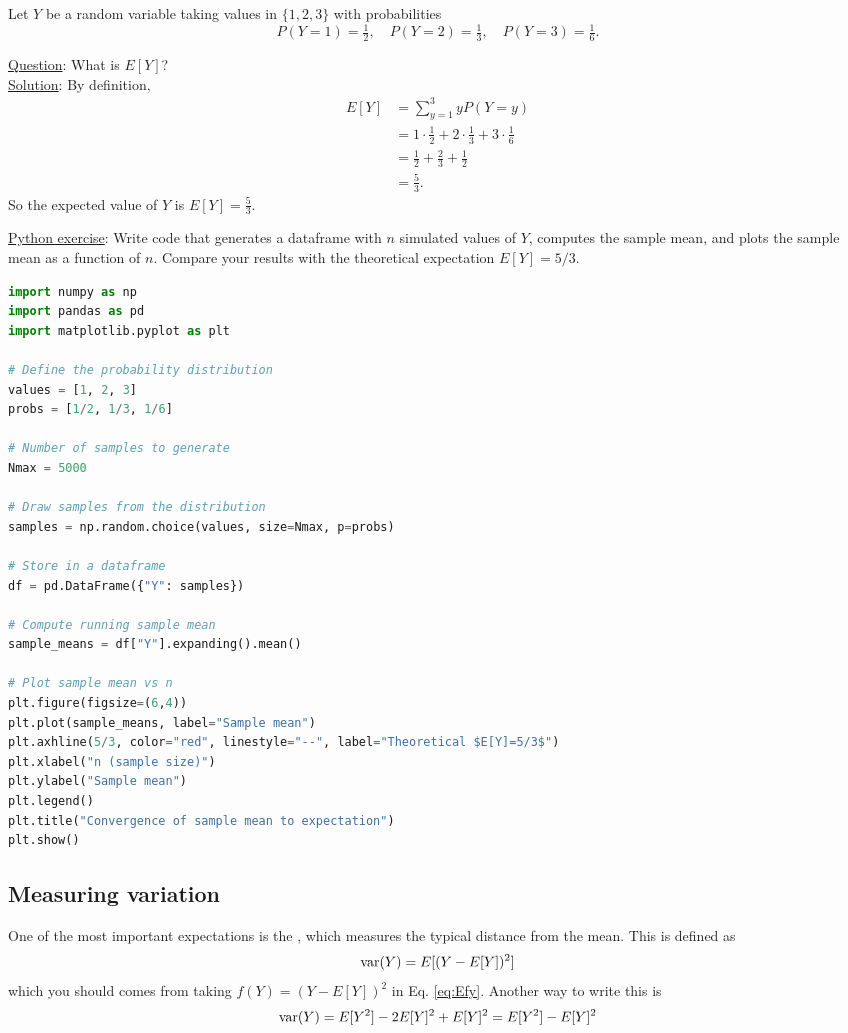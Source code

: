 \begin{example}
Let $Y$ be a random variable taking values in $\{1,2,3\}$ with probabilities
\[
P(Y=1)=\tfrac{1}{2}, \quad P(Y=2)=\tfrac{1}{3}, \quad P(Y=3)=\tfrac{1}{6}.
\]

\noindent
\underline{Question}: What is $E[Y]$?\\

\noindent
\underline{Solution}: By definition,
\begin{align*}
E[Y] &= \sum_{y=1}^3 y P(Y=y) \\
     &= 1\cdot \tfrac{1}{2} + 2\cdot \tfrac{1}{3} + 3\cdot \tfrac{1}{6} \\
     &= \tfrac{1}{2} + \tfrac{2}{3} + \tfrac{1}{2} \\
     &= \tfrac{5}{3}.
\end{align*}
So the expected value of $Y$ is $E[Y] = \tfrac{5}{3}$. 

\noindent
\underline{Python exercise}: Write code that generates a dataframe with $n$ simulated values of $Y$, computes the sample mean, and plots the sample mean as a function of $n$. Compare your results with the theoretical expectation $E[Y]=5/3$. 

\begin{lstlisting}[language=Python]
import numpy as np
import pandas as pd
import matplotlib.pyplot as plt

# Define the probability distribution
values = [1, 2, 3]
probs = [1/2, 1/3, 1/6]

# Number of samples to generate
Nmax = 5000

# Draw samples from the distribution
samples = np.random.choice(values, size=Nmax, p=probs)

# Store in a dataframe
df = pd.DataFrame({"Y": samples})

# Compute running sample mean
sample_means = df["Y"].expanding().mean()

# Plot sample mean vs n
plt.figure(figsize=(6,4))
plt.plot(sample_means, label="Sample mean")
plt.axhline(5/3, color="red", linestyle="--", label="Theoretical $E[Y]=5/3$")
plt.xlabel("n (sample size)")
plt.ylabel("Sample mean")
plt.legend()
plt.title("Convergence of sample mean to expectation")
plt.show()
\end{lstlisting}
\end{example}

\subsection{Measuring variation}
One of the most important expectations is the , which measures the typical distance from the mean. This is defined as
\begin{equation*}
{\rm var}(Y) = E[(Y-E[Y])^2]
\end{equation*}
which you should comes from taking $f(Y) = (Y-E[Y])^2$ in Eq. \ref{eq:Efy}. 
Another way to write this is 
\begin{equation*}
 {\rm var}(Y) = E[Y^2] - 2E[Y]^2 + E[Y]^2 = E[Y^2]-E[Y]^2
\end{equation*}

